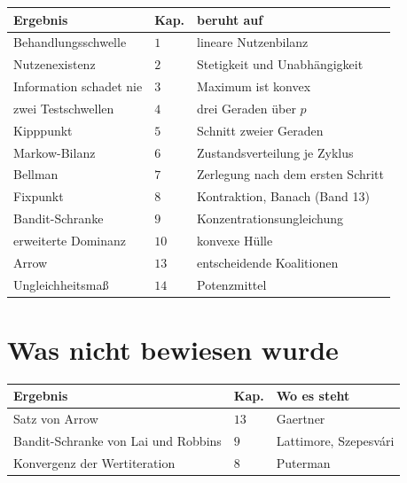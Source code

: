\begin{merksatz}
\begin{center}
{\small
\renewcommand{\arraystretch}{1.4}
\begin{tabular}{@{}P{3.6cm}P{1.0cm}P{3.6cm}@{}}
\toprule
\textbf{Ergebnis} & \textbf{Kap.} & \textbf{beruht auf}\\
\midrule
Behandlungsschwelle & $1$ & lineare Nutzenbilanz\\
Nutzenexistenz & $2$ & Stetigkeit und Unabhängigkeit\\
Information schadet nie & $3$ & Maximum ist konvex\\
zwei Testschwellen & $4$ & drei Geraden über $p$\\
Kipppunkt & $5$ & Schnitt zweier Geraden\\
Markow-Bilanz & $6$ & Zustandsverteilung je Zyklus\\
Bellman & $7$ & Zerlegung nach dem ersten Schritt\\
Fixpunkt & $8$ & Kontraktion, Banach (Band 13)\\
Bandit-Schranke & $9$ & Konzentrations\-ungleichung\\
erweiterte Dominanz & $10$ & konvexe Hülle\\
Arrow & $13$ & entscheidende Koalitionen\\
Ungleichheitsmaß & $14$ & Potenzmittel\\
\bottomrule
\end{tabular}}
\end{center}
\end{merksatz}

\section{Was nicht bewiesen wurde}

\begin{merksatz}
\begin{center}
{\small
\renewcommand{\arraystretch}{1.5}
\begin{tabular}{@{}P{3.4cm}P{1.2cm}P{3.4cm}@{}}
\toprule
\textbf{Ergebnis} & \textbf{Kap.} & \textbf{Wo es steht}\\
\midrule
Satz von Arrow & $13$ & Gaertner\\
Bandit-Schranke von Lai und Robbins & $9$ & Lattimore, Szepesvári\\
Konvergenz der Wertiteration & $8$ & Puterman\\
\bottomrule
\end{tabular}}
\end{center}

\begin{center}
\begin{minipage}{0.88\textwidth}
\end{minipage}
\end{center}
\end{merksatz}

